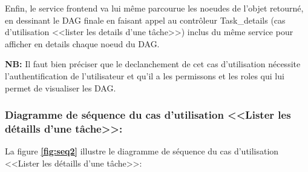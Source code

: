     \par Enfin, le service frontend va lui même parcourue les noeudes de l'objet retourné, en dessinant le DAG finale en faisant appel au contrôleur Task\_details (cas d'utilisation <<lister les details d'une tâche>>) inclus du même service pour afficher en details chaque noeud du DAG.
    \par \textbf{NB:} Il faut bien préciser que le declanchement de cet cas d'utilisation nécessite l'authentification de l'utilisateur et qu'il a les permissons et les roles qui lui permet de visualiser les DAG.
    \subsubsection{Diagramme de séquence du cas d'utilisation <<Lister les détaills d'une tâche>>:}
    \par La figure \textbf{\ref*{fig:seq2}} illustre le diagramme de séquence du cas d'utilisation <<Lister les détaills d'une tâche>>:

